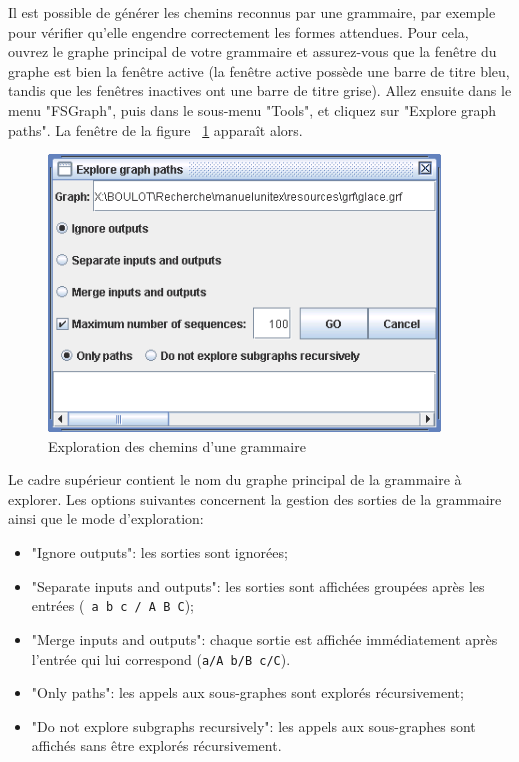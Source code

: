 Il est possible de générer les chemins reconnus par une grammaire, par exemple pour
vérifier qu’elle engendre correctement les formes attendues. Pour cela, ouvrez le graphe
principal de votre grammaire et assurez-vous que la fenêtre du graphe est bien la fenêtre active
(la fenêtre active possède une barre de titre bleu, tandis que les fenêtres inactives ont une
barre de titre grise). Allez ensuite dans le menu "FSGraph", puis dans le sous-menu "Tools",
et cliquez sur "Explore graph paths". La fenêtre de la figure 
~\ref{fig-explore-graph-paths} apparaît alors.


\begin{figure}[!h]
\begin{center}
\includegraphics[width=10.4cm]{resources/img/fig6-18.png}
\caption{Exploration des chemins d’une grammaire\label{fig-explore-graph-paths}}
\end{center}
\end{figure}

\bigskip
\noindent Le cadre supérieur contient le nom du graphe principal de la grammaire à explorer.
Les options suivantes concernent la gestion des sorties de la grammaire ainsi que le mode
d’exploration:


\begin{itemize}
  \item "Ignore outputs": les sorties sont ignorées;
  \item "Separate inputs and outputs": les sorties sont affichées groupées après les entrées
  (\verb$ a b c / A B C$);
  \item "Merge inputs and outputs": chaque sortie est affichée immédiatement après l’entrée 
  	  qui lui correspond
  (\verb$a/A b/B c/C$).
  \item "Only paths": les appels aux sous-graphes sont explorés récursivement;
  \item "Do not explore subgraphs recursively": les appels aux sous-graphes sont affichés sans
être explorés récursivement.
\end{itemize}

